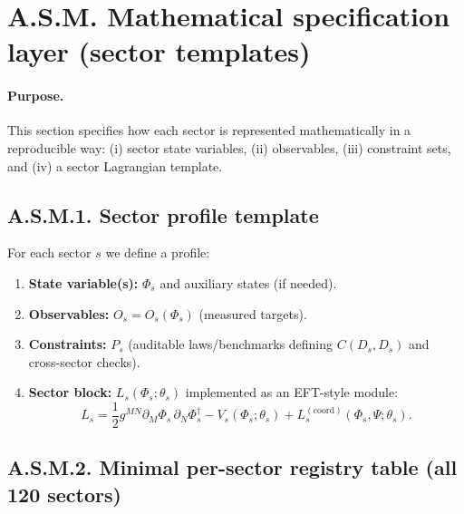 \documentclass[13pt,a4paper]{article}
\begin{document}
	\section*{A.S.M. Mathematical specification layer (sector templates)}
	\label{sec:sector-math-layer}
	
	\paragraph{Purpose.}
	This section specifies how each sector is represented mathematically in a reproducible way: (i) sector state variables, (ii) observables, (iii) constraint sets, and (iv) a sector Lagrangian template.
	
	\subsection*{A.S.M.1. Sector profile template}
	
	For each sector $s$ we define a profile:
	\begin{enumerate}[leftmargin=*]
		\item \textbf{State variable(s):} $\Phi_s$ and auxiliary states (if needed).
		\item \textbf{Observables:} $O_s=O_s(\Phi_s)$ (measured targets).
		\item \textbf{Constraints:} $P_s$ (auditable laws/benchmarks defining $C(D_s,D_s)$ and cross-sector checks).
		\item \textbf{Sector block:} $L_s(\Phi_s;\theta_s)$ implemented as an EFT-style module:
		$$
		L_s = \frac{1}{2}g^{MN}\partial_M\Phi_s\,\partial_N\Phi_s^\dagger - V_s(\Phi_s;\theta_s) + L^{(\mathrm{coord})}_s(\Phi_s,\Psi;\theta_s).
		$$
	\end{enumerate}
	
	\subsection*{A.S.M.2. Minimal per-sector registry table (all 120 sectors)}
	
\end{document}
